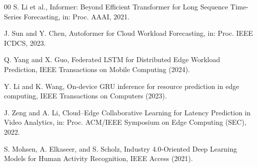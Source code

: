 \documentclass[a4paper,fleqn]{cas-dc}
\begin{document}
\begin{thebibliography}{00}
S. Li et al.,
Informer: Beyond Efficient Transformer for Long Sequence Time-Series Forecasting,
in: Proc. AAAI, 2021.

J. Sun and Y. Chen,
Autoformer for Cloud Workload Forecasting,
in: Proc. IEEE ICDCS, 2023.

Q. Yang and X. Guo,
Federated LSTM for Distributed Edge Workload Prediction,
IEEE Transactions on Mobile Computing (2024).

Y. Li and K. Wang,
On-device GRU inference for resource prediction in edge computing,
IEEE Transactions on Computers (2023).

J. Zeng and A. Li,
Cloud--Edge Collaborative Learning for Latency Prediction in Video Analytics,
in: Proc. ACM/IEEE Symposium on Edge Computing (SEC), 2022.

S. Mohsen, A. Elkaseer, and S. Scholz,
Industry 4.0-Oriented Deep Learning Models for Human Activity Recognition,
IEEE Access (2021).

\end{thebibliography}
\end{document}
